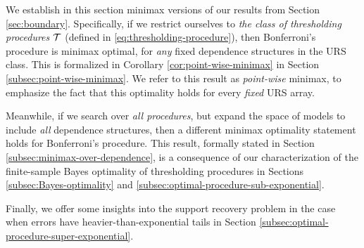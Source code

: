 
We establish in this section minimax versions of our results from Section \ref{sec:boundary}.
Specifically, if we restrict ourselves to \emph{the class of thresholding procedures} $\cal T$ (defined in \eqref{eq:thresholding-procedure}), then Bonferroni's procedure is minimax optimal, for \emph{any} fixed dependence structures in the URS class.
This is formalized in Corollary \ref{cor:point-wise-minimax} in Section \ref{subsec:point-wise-minimax}.
We refer to this result as \emph{point-wise} minimax, to emphasize the fact that this optimality holds for every \emph{fixed} URS array.

Meanwhile, if we search over \emph{all procedures}, but expand the space of models to include {\em all} dependence structures, then a different minimax optimality statement holds for Bonferroni's procedure.
This result, formally stated in Section \ref{subsec:minimax-over-dependence}, is a consequence of our characterization of the finite-sample Bayes optimality of thresholding procedures in Sections \ref{subsec:Bayes-optimality} and \ref{subsec:optimal-procedure-sub-exponential}.

Finally, we offer some insights into the support recovery problem in the case when errors have heavier-than-exponential tails in Section \ref{subsec:optimal-procedure-super-exponential}.





